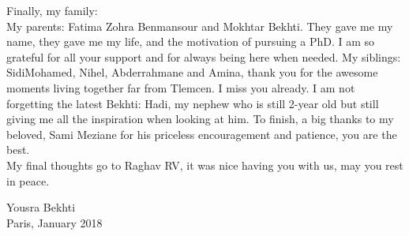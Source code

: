 \begin{acknowledgements}
Finally, my family: \\
My parents: Fatima Zohra Benmansour and Mokhtar Bekhti. They gave me my name, they gave me my life, and the motivation of pursuing a PhD. I am so grateful for all your support and for always being here when needed. My siblings: SidiMohamed, Nihel, Abderrahmane and Amina, thank you for the awesome moments living together far from Tlemcen. I miss you already. I am not forgetting the latest Bekhti: Hadi, my nephew who is still 2-year old but still giving me all the inspiration when looking at him. To finish, a big thanks to my beloved, Sami Meziane for his priceless encouragement and patience, you are the best.\\

My final thoughts go to Raghav RV, it was nice having you with us, may you rest in peace.

{\raggedleft Yousra Bekhti\\}%
{\raggedleft Paris, January 2018\\}
\end{acknowledgements}
\leavevmode\thispagestyle{empty}\newpage